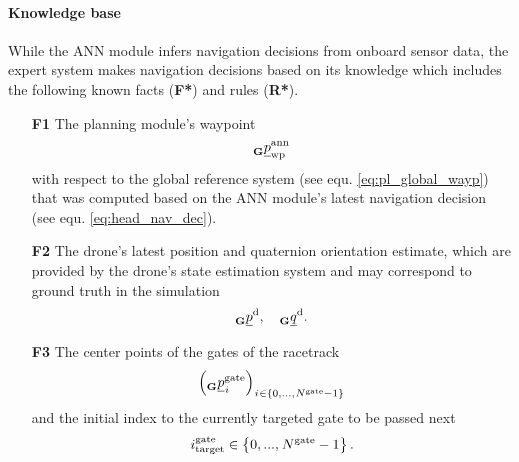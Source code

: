 \paragraph*{Knowledge base} $\ $\\
While the ANN module infers navigation decisions from onboard sensor data,
the expert system makes navigation decisions based on its knowledge
which includes the following known facts (\textbf{F*}) and rules (\textbf{R*}).
\begin{itemize}
    
    \item [\textbf{F1}] 
    The planning module's waypoint
    \begin{equation}
        \pos[]{\text{ann}}{\wayp}{\grs}{}
    \end{equation}
     with respect to the global reference system
    (see equ. \ref{eq:pl_global_wayp}) 
    that was computed based
    on the ANN module's latest navigation decision
    (see equ. \ref{eq:head_nav_dec}).
    

    \item [\textbf{F2}] The drone's latest position and quaternion orientation estimate,
    which are provided by the drone's state estimation system and 
    may correspond to ground truth in the simulation
    \begin{equation}
        \pos[]{\drone}{}{\grs}{}
        ,\quad 
        \quat[]{\drone}{}{\grs}{}.
    \end{equation}
    
    \item [\textbf{F3}] The center points of the gates of the racetrack
    \begin{equation}
        \left( 
            \pos[]{\gate}{\idx[]{}{}{}{}}{\grs}{}
        \right)
        _{\idx[]{}{}{}{} \in \left\{0, ..., \num[]{\gate}{}{}{} - 1 \right\}}
    \end{equation}
    and the initial index to the currently targeted gate to be passed next
    \begin{equation}
        \idx[]{\gate}{\target}{}{} \in \left\{0, ..., \num[]{\gate}{}{}{} - 1 \right\}
        .
    \end{equation}


\end{itemize}
